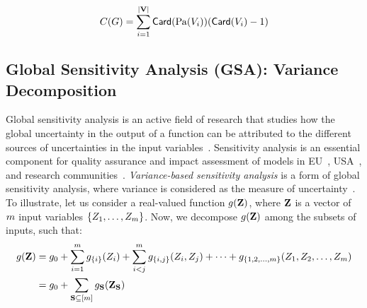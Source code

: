 \begin{align}
	C(G) = \sum_{i=1}^{|\mathbf{V}|} \mathsf{Card}(\mathrm{Pa}(V_i))(\mathsf{Card}(V_i) - 1)
\end{align}


\subsection{Global Sensitivity Analysis (GSA): Variance Decomposition}
Global sensitivity analysis is an active field of research that studies how the global uncertainty in the output of a function can be attributed to the different sources of uncertainties in the input variables~\cite{saltelli2008global}.
Sensitivity analysis is an essential component for quality assurance and impact assessment of models in EU~\cite{eu}, USA~\cite{usepa}, and research communities~\cite{saltelli2020five}.
\emph{Variance-based sensitivity analysis} is a form of global sensitivity analysis, where variance is considered as the measure of uncertainty~\cite{sobol1990sensitivity,sobol2001global}. To illustrate, let us consider a real-valued function $  g(\mathbf{Z}) $, where $ \mathbf{Z} $ is a vector of $ m $ input variables $ \{Z_1, \dots, Z_{m}\} $.
Now, we decompose $ g(\mathbf{Z}) $ among the subsets of inputs, such that:
\begin{align}
	g(\mathbf{Z}) &= g_0 + \sum_{i=1}^{m} g_{\{i\}}(Z_i) +  \sum_{i < j}^{m} g_{\{i,j\}}(Z_i, Z_j)  + \cdots\notag + g_{\{1, 2, \dots, m\}} (Z_1, Z_2, \dots, Z_{m})\\
	&= g_0 +  \sum_{\mathbf{S} \subseteq [m]} g_{\mathbf{S}}(\mathbf{Z}_{\mathbf{S}})\label{fairness_fairXplainer_eq:functional_decomposition_set_notation}
\end{align}
